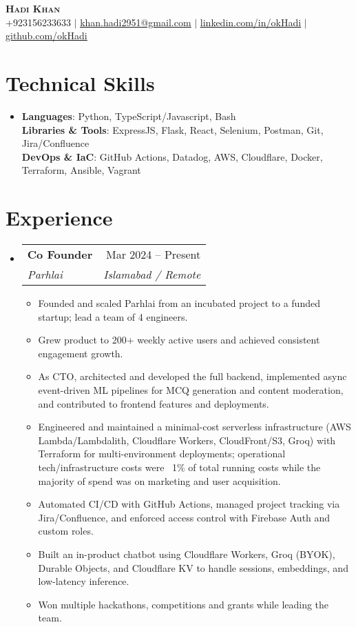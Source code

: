 \documentclass[letterpaper,11pt]{article}
\makeatletter
\newcommand{\resumeItem}[1]{
  \item\small{
    {#1 \vspace{-2pt}}
  }
}
\newcommand{\resumeSubheading}[4]{
  \vspace{-2pt}\item
    \begin{tabular*}{0.97\textwidth}[t]{l@{\extracolsep{\fill}}r}
      \textbf{#1} & #2 \\
      \textit{\small#3} & \textit{\small #4} \\
    \end{tabular*}\vspace{-7pt}
}
\newcommand{\resumeSubHeadingListStart}{\begin{itemize}[leftmargin=0.15in, label={}]}
\newcommand{\resumeSubHeadingListEnd}{\end{itemize}}
\newcommand{\resumeItemListStart}{\begin{itemize}}
\newcommand{\resumeItemListEnd}{\end{itemize}\vspace{-5pt}}
\makeatother
\begin{document}
\begin{center}
    \textbf{\Huge \scshape Hadi Khan} \\ \vspace{1pt}
    \small +923156233633 $|$ \href{mailto:khan.hadi2951@gmail.com}{\underline{khan.hadi2951@gmail.com}} $|$
    \href{https://www.linkedin.com/in/okhadi/}{\underline{linkedin.com/in/okHadi}} $|$
    \href{https://github.com/okHadi}{\underline{github.com/okHadi}}
\end{center}

\section{Technical Skills}
  \begin{itemize}[leftmargin=0.15in, label={}]
    \item \small{
      \textbf{Languages}{: Python, TypeScript/Javascript, Bash} \\
      \textbf{Libraries \& Tools}{: ExpressJS, Flask, React, Selenium, Postman, Git, Jira/Confluence } \\
      \textbf{DevOps \& IaC}{: GitHub Actions, Datadog, AWS, Cloudflare, Docker, Terraform, Ansible, Vagrant} \\
      }
  \end{itemize}

\section{Experience}

  \resumeSubHeadingListStart

    \resumeSubheading
      {Co Founder}{Mar 2024 -- Present}
      {Parhlai}{Islamabad / Remote}
      \resumeItemListStart
        \resumeItem{Founded and scaled Parhlai from an incubated project to a funded startup; lead a team of 4 engineers.}
        \resumeItem{Grew product to 200+ weekly active users and achieved consistent engagement growth.}
    \resumeItem{As CTO, architected and developed the full backend, implemented async event-driven ML pipelines for MCQ generation and content moderation, and contributed to frontend features and deployments.}
    \resumeItem{Engineered and maintained a minimal-cost serverless infrastructure (AWS Lambda/Lambdalith, Cloudflare Workers, CloudFront/S3, Groq) with Terraform for multi-environment deployments; operational tech/infrastructure costs were ~1\% of total running costs while the majority of spend was on marketing and user acquisition.}
    \resumeItem{Automated CI/CD with GitHub Actions, managed project tracking via Jira/Confluence, and enforced access control with Firebase Auth and custom roles.}
    \resumeItem{Built an in-product chatbot using Cloudflare Workers, Groq (BYOK), Durable Objects, and Cloudflare KV to handle sessions, embeddings, and low-latency inference.}
    \resumeItem{Won multiple hackathons, competitions and grants while leading the team.}
      \resumeItemListEnd
  \resumeSubHeadingListEnd
\end{document}
